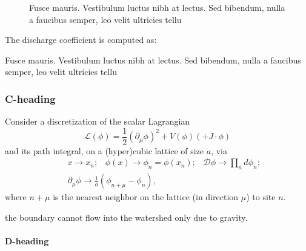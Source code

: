 \begin{figure}
{\hspace*{-3pc}}
{\hspace*{-3pc}\begin{minipage}{33pc}
\caption{Fusce mauris. Vestibulum luctus nibh at lectus. Sed bibendum, nulla a faucibus semper, leo velit
ultricies tellu}
\end{minipage}}
\end{figure}

The discharge coefficient is computed as:

\begin{example}{\label{ch01:exa3.1}}
\lipsum[5]

\solution \lipsum[5]
\lipsum[5]

\begin{nboxfig}
{}
{Fusce mauris. Vestibulum luctus nibh at lectus. Sed bibendum, nulla a faucibus semper, leo velit
ultricies tellu}
\end{nboxfig}
\end{example}

\lipsum[5]
\lipsum[5]

\subsubsection{C-heading}
\lipsum[5]

Consider a discretization of the scalar Lagrangian
\begin{equation}
\mathcal{L}(\phi)=\frac{1}{2}(\partial_\mu\phi)^2+V(\phi)(+J\cdot
\phi)\label{ch63:eqn63.1}
\end{equation}
and its path integral, on a (hyper)cubic lattice of size $a$, via
\begin{eqnarray}
&&x\rightarrow x_n;\;\;\; \phi(x)\rightarrow \phi_n=\phi(x_n);\;\;\;
\mathcal{D}\phi\rightarrow \prod_n d\phi_n;\nonumber\\
&&\partial_\mu\phi\rightarrow
\frac{1}{a}(\phi_{n+\mu}-\phi_n),\label{ch63:eqn63.2}
\end{eqnarray}
where $n+\mu$ is the nearest neighbor on the lattice (in direction
$\mu$) to site $n$.

\lipsum[5] the boundary cannot flow into the
watershed only due to gravity.

\paragraph{D-heading}
\lipsum[5]


